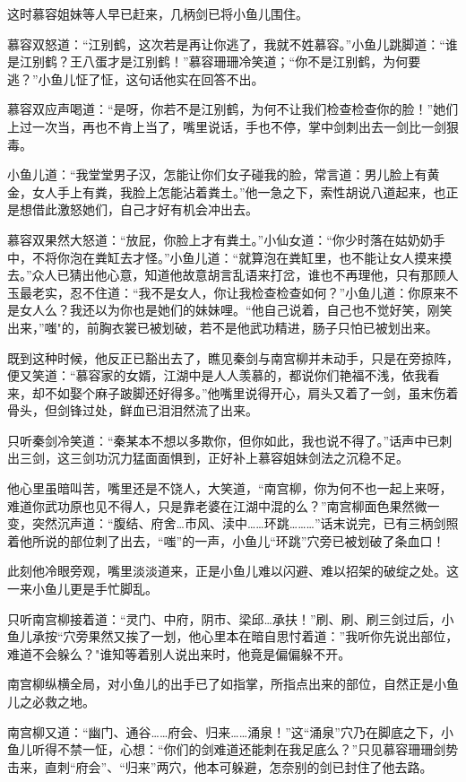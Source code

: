 \documentclass[12pt,oneside]{book}
\begin{document}
这时慕容姐妹等人早已赶来，几柄剑已将小鱼儿围住。

慕容双怒道：``江别鹤，这次若是再让你逃了，我就不姓慕容。''小鱼儿跳脚道：``谁是江别鹤？王八蛋才是江别鹤！''慕容珊珊冷笑道；``你不是江别鹤，为何要逃？''小鱼儿怔了怔，这句话他实在回答不出。

慕容双应声喝道：``是呀，你若不是江别鹤，为何不让我们检查检查你的脸！''她们上过一次当，再也不肯上当了，嘴里说话，手也不停，掌中剑刺出去一剑比一剑狠毒。

小鱼儿道：``我堂堂男子汉，怎能让你们女子碰我的脸，常言道：男儿脸上有黄金，女人手上有粪，我脸上怎能沾着粪土。''他一急之下，索性胡说八道起来，也正是想借此激怒她们，自己才好有机会冲出去。

慕容双果然大怒道：``放屁，你脸上才有粪土。''小仙女道：``你少时落在姑奶奶手中，不将你泡在粪缸去才怪。''小鱼儿道：``就算泡在粪缸里，也不能让女人摸来摸去。''众人已猜出他心意，知道他故意胡言乱语来打岔，谁也不再理他，只有那顾人玉最老实，忍不住道：``我不是女人，你让我检查检查如何？''小鱼儿道：你原来不是女人么？我还以为你也是她们的妹妹哩。``他自己说着，自己也不觉好笑，刚笑出来，''嗤"的，前胸衣裳已被划破，若不是他武功精进，肠子只怕已被划出来。

既到这种时候，他反正已豁出去了，瞧见秦剑与南宫柳并未动手，只是在旁掠阵，便又笑道：``慕容家的女婿，江湖中是人人羡慕的，都说你们艳福不浅，依我看来，却不如娶个麻子跛脚还好得多。''他嘴里说得开心，肩头又着了一剑，虽末伤着骨头，但剑锋过处，鲜血已泪泪然流了出来。

只听秦剑冷笑道：``秦某本不想以多欺你，但你如此，我也说不得了。''话声中已刺出三剑，这三剑功沉力猛面面惧到，正好补上慕容姐妹剑法之沉稳不足。

他心里虽暗叫苦，嘴里还是不饶人，大笑道，``南宫柳，你为何不也一起上来呀，难道你武功原也见不得人，只是靠老婆在江湖中混的么？''南宫柳面色果然微一变，突然沉声道：``腹结、府舍\ldots 市风、渎中\ldots\ldots 环跳\ldots\ldots\ldots{}''话末说完，已有三柄剑照着他所说的部位刺了出去，``嗤''的一声，小鱼儿``环跳''穴旁已被划破了条血口！

此刻他冷眼旁观，嘴里淡淡道来，正是小鱼儿难以闪避、难以招架的破绽之处。这一来小鱼儿更是手忙脚乱。

只听南宫柳接着道：``灵门、中府，阴市、梁邱\ldots 承扶！''刷、刷、刷三剑过后，小鱼儿承按``穴旁果然又挨了一划，他心里本在暗自思忖着道：''我听你先说出部位，难道不会躲么？"谁知等着别人说出来时，他竟是偏偏躲不开。

南宫柳纵横全局，对小鱼儿的出手已了如指掌，所指点出来的部位，自然正是小鱼儿之必救之地。

南宫柳又道：``幽门、通谷\ldots\ldots 府会、归来\ldots\ldots 涌泉！''这``涌泉''穴乃在脚底之下，小鱼儿听得不禁一怔，心想：``你们的剑难道还能刺在我足底么？''只见慕容珊珊剑势击来，直刺``府会''、``归来''两穴，他本可躲避，怎奈别的剑已封住了他去路。
\end{document}
